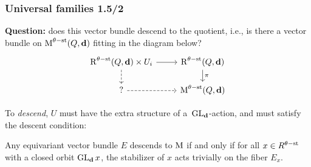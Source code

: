 \documentclass{beamer}
\begin{document}
\begin{frame}
    \frametitle{Universal families 1.5/2}   
{\bf Question:} does this vector bundle descend to the quotient, i.e.,
is there a vector bundle on $\operatorname{M}^{\theta-\mathrm{st}}(Q, \mathbf{d})$
fitting in the diagram below? \pause
\[ \begin{tikzcd}[row sep=0.5cm, ampersand replacement=\&]
    \parameterspace^{\theta\stable}(Q, \tuple{d}) \times U_i \arrow[r]\arrow[d, dashed] \& \parameterspace^{\theta\stable}(Q, \tuple{d}) \arrow[d, "\pi"] \\ 
    {?} \arrow[r, dashed] \& \modulispace^{\theta\stable}(Q, \tuple{d})
\end{tikzcd} \] \pause

To \emph{descend}, $U$ must have the extra structure of
a~$\operatorname{\operatorname{GL}_{\mathbf{d}}}$-action, and must satisfy the descent condition: \pause
\begin{lemma}
    Any equivariant vector bundle $E$ descends to $\operatorname{M}$ if and only if
    for all $x \in R^{\theta-\mathrm{st}}$
    with a closed orbit $\operatorname{\operatorname{GL}_{\mathbf{d}}} x$, the stabilizer of
    $x$ acts trivially on the fiber $E_x$.
\end{lemma}
\end{frame}
\end{document}

